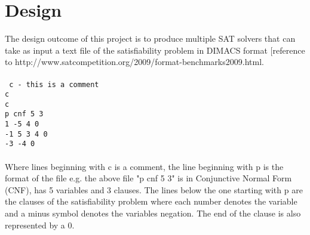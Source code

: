 \documentclass[12pt,a4paper]{article}
\begin{document}




\section{Design}
The design outcome of this project is to produce multiple SAT solvers that can take as input a text file of the satisfiability problem in DIMACS format [reference to http://www.satcompetition.org/2009/format-benchmarks2009.html. \\\\
\texttt{
c - this is a comment\\
c \\
c \\
p cnf 5 3\\
1 -5 4 0\\
-1 5 3 4 0\\
-3 -4 0\\
}\\
Where lines beginning with c is a comment, the line beginning with p is the format of the file e.g. the above file "p cnf 5 3" is in Conjunctive Normal Form (CNF), has 5 variables and 3 clauses. The lines below the one starting with p are the clauses of the satisfiability problem where each number denotes the variable and a minus symbol denotes the variables negation. The end of the clause is also represented by a 0.\\\\
\end{document}
